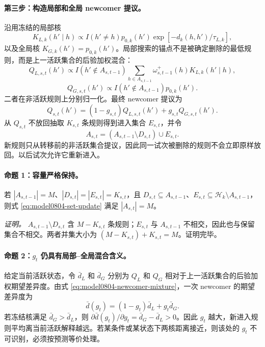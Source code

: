 \paragraph{第三步：构造局部和全局 newcomer 提议。}
沿用冻结的局部核
\begin{equation}
    K_{L,k}(h'\mid h)
    \propto I(h'\neq h)p_{0,k}(h')
    \exp[-d_k(h,h')/\tau_{L,k}],
    \label{eq:model0804-local-kernel}
\end{equation}
以及全局核 $K_{G,k}(h')=p_{0,k}(h')$。局部搜索的锚点不是被确定删除的最低规则，而是上一活跃集合的后验加权混合：
\begin{equation}
    Q_{L,s,t}(h')
    \propto I(h'\notin A_{s,t-1})
    \sum_{h\in A_{s,t-1}}
    \omega^+_{s,t-1}(h)K_{L,k}(h'\mid h),
    \label{eq:model0804-active-local-proposal}
\end{equation}
\begin{equation}
    Q_{G,s,t}(h')
    \propto I(h'\notin A_{s,t-1})p_{0,k}(h').
    \label{eq:model0804-active-global-proposal}
\end{equation}
二者在非活跃规则上分别归一化。最终 newcomer 提议为
\begin{equation}
    Q_{s,t}(h')
    =(1-g_{s,t})Q_{L,s,t}(h')
      +g_{s,t}Q_{G,s,t}(h').
    \label{eq:model0804-newcomer-mixture}
\end{equation}
从 $Q_{s,t}$ 不放回抽取 $K_{s,t}$ 条规则得到进入集合 $E_{s,t}$，并令
\begin{equation}
    A_{s,t}
    =(A_{s,t-1}\setminus D_{s,t})\cup E_{s,t}.
    \label{eq:model0804-set-update}
\end{equation}
新规则只从转移前的非活跃集合提议，因此同一试次被删除的规则不会立即原样放回。以后试次允许它重新进入。

\paragraph{命题 1：容量严格保持。}
若 $|A_{s,t-1}|=M$、$|D_{s,t}|=|E_{s,t}|=K_{s,t}$，且 $D_{s,t}\subseteq A_{s,t-1}$、$E_{s,t}\subseteq\mathcal H_k\setminus A_{s,t-1}$，则式 \ref{eq:model0804-set-update} 满足 $|A_{s,t}|=M$。

\textit{证明。}
$A_{s,t-1}\setminus D_{s,t}$ 含 $M-K_{s,t}$ 条规则；$E_{s,t}$ 与 $A_{s,t-1}$ 不相交，因此也与保留集合不相交。两者并集大小为 $(M-K_{s,t})+K_{s,t}=M$。证明完毕。

\paragraph{命题 2：$g_t$ 仍具有局部--全局混合含义。}
给定当前活跃状态，令 $\bar d_L$ 和 $\bar d_G$ 分别为 $Q_L$ 和 $Q_G$ 相对于上一活跃集合的后验加权期望差异度。由式 \ref{eq:model0804-newcomer-mixture}，一次 newcomer 的期望差异度为
\begin{equation}
    \bar d(g_t)=(1-g_t)\bar d_L+g_t\bar d_G.
    \label{eq:model0804-distance-mixture}
\end{equation}
若冻结核满足 $\bar d_G>\bar d_L$，则 $\partial\bar d(g_t)/\partial g_t=\bar d_G-\bar d_L>0$。因此 $g_t$ 越大，新进入规则平均离当前活跃解释越远。若某条件或某状态下两核距离接近，则该处的 $g_t$ 不可识别，必须按预测等价处理。

